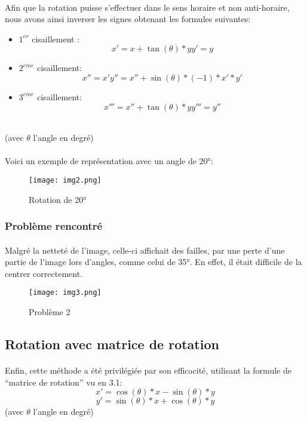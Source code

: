 \documentclass{article}
\begin{document}
\paragraph{}
Afin que la rotation puisse s’effectuer dans le sens horaire et non anti-horaire, nous avons ainsi inverser les signes obtenant les formules suivantes:
\begin{itemize}
    \item $1^{er}$ cisaillement :
    $$
    x' = x + \tan(\theta) * y
    y' = y
    $$
    \item $2^{eme}$ cisaillement:
    $$
    x'' = x'
    y'' = x'' + \sin(\theta) * (-1) * x' * y'
    $$
    \item $3^{eme}$ cisaillement:
    $$
    x''' = x'' + \tan(\theta) * y
    y''' = y''
    $$
\end{itemize}\\
(avec $\theta$ l’angle en degré)\\\\
Voici un exemple de représentation avec un angle de 20°:
\begin{figure}[H]
    \centering
    \texttt{[image: img2.png]}
    \caption{Rotation de 20°}
\end{figure}
\subsubsection{Problème rencontré}
\paragraph{}
Malgré la netteté de l’image, celle-ci affichait des failles, par une perte d’une partie de l’image lors d'angles, comme celui de 35°. En effet, il était difficile de la centrer correctement.
\begin{figure}[H]
    \centering
    \texttt{[image: img3.png]}
    \caption{Problème 2}
\end{figure}
\subsection{Rotation avec matrice de rotation}
\paragraph{}
Enfin, cette méthode a été privilégiée par son efficacité, utilisant la formule de “matrice de rotation” vu en 3.1:
$$
x' = \cos(\theta) * x - \sin(\theta) * y
$$
$$
y' = \sin(\theta) * x + \cos(\theta) * y
$$
(avec $\theta$ l’angle en degré)
\end{document}
